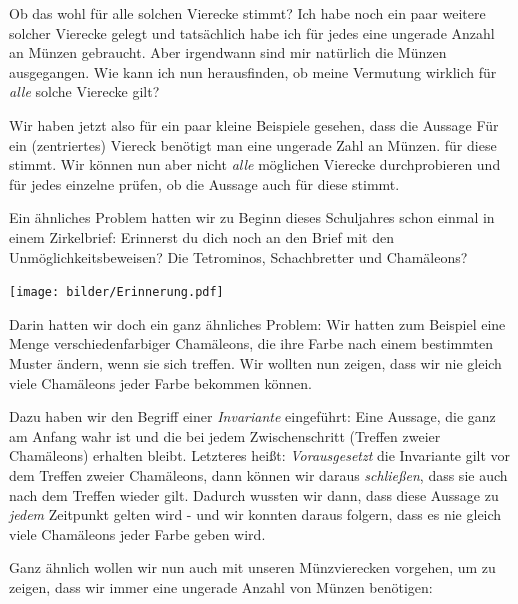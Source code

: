 \documentclass[a4paper,ngerman,12pt]{scrartcl}
\theoremstyle{definition}
\theoremstyle{plain}
\theoremstyle{remark}
\begin{document}
Ob das wohl für alle solchen Vierecke stimmt? Ich habe noch ein paar weitere solcher Vierecke gelegt und tatsächlich habe ich für jedes eine ungerade Anzahl an Münzen gebraucht. Aber irgendwann sind mir natürlich die Münzen ausgegangen. Wie kann ich nun herausfinden, ob meine Vermutung wirklich für \emph{alle} solche Vierecke gilt?

Wir haben jetzt also für ein paar kleine Beispiele gesehen, dass die Aussage \glqq Für ein (zentriertes) Viereck benötigt man eine ungerade Zahl an Münzen.\grqq{} für diese stimmt. Wir können nun aber nicht \emph{alle} möglichen Vierecke durchprobieren und für jedes einzelne prüfen, ob die Aussage auch für diese stimmt.

Ein ähnliches Problem hatten wir zu Beginn dieses Schuljahres schon einmal in einem Zirkelbrief: Erinnerst du dich noch an den Brief mit den Unmöglichkeitsbeweisen? Die Tetrominos, Schachbretter und Chamäleons? 

\begin{center}
	\texttt{[image: bilder/Erinnerung.pdf]}
\end{center}

Darin hatten wir doch ein ganz ähnliches Problem: Wir hatten zum Beispiel eine Menge verschiedenfarbiger Chamäleons, die ihre Farbe nach einem bestimmten Muster ändern, wenn sie sich treffen. Wir wollten nun zeigen, dass wir nie gleich viele Chamäleons jeder Farbe bekommen können.

Dazu haben wir den Begriff einer \emph{Invariante} eingeführt: Eine Aussage, die ganz am Anfang wahr ist und die bei jedem Zwischenschritt (Treffen zweier Chamäleons) erhalten bleibt. Letzteres heißt: \emph{Vorausgesetzt} die Invariante gilt vor dem Treffen zweier Chamäleons, dann können wir daraus \emph{schließen}, dass sie auch nach dem Treffen wieder gilt. Dadurch wussten wir dann, dass diese Aussage zu \emph{jedem} Zeitpunkt gelten wird - und wir konnten daraus folgern, dass es nie gleich viele Chamäleons jeder Farbe geben wird.

Ganz ähnlich wollen wir nun auch mit unseren Münzvierecken vorgehen, um zu zeigen, dass wir immer eine ungerade Anzahl von Münzen benötigen:
\end{document}
